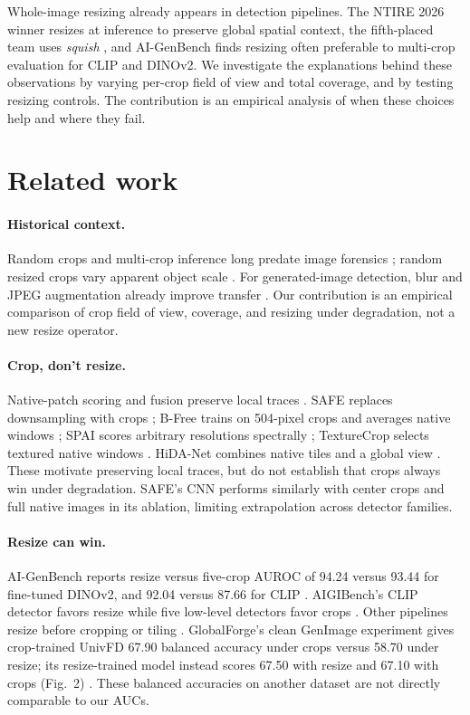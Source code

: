 \documentclass[letterpaper]{article} %
\begin{document}
Whole-image resizing already appears in detection pipelines. The NTIRE
2026 winner resizes at inference to preserve global spatial context, the
fifth-placed team uses \emph{squish} \cite{gushchin2026ntire}, and AI-GenBench
\cite{pellegrini2025aigenbench} finds resizing often preferable to multi-crop
evaluation for CLIP and DINOv2. We investigate the explanations behind these
observations by varying per-crop field of view and total coverage, and by
testing resizing controls. The contribution is an empirical analysis of
when these choices help and where they fail.

\section{Related work}
\label{sec:related}

\paragraph{Historical context.} Random crops and multi-crop inference long predate image forensics \cite{krizhevsky2012imagenet}; random resized crops vary apparent object scale \cite{szegedy2015going}. For generated-image detection, blur and JPEG augmentation already improve transfer \cite{wang2020cnn}. Our contribution is an empirical comparison of crop field of view, coverage, and resizing under degradation, not a new resize operator.

\paragraph{Crop, don't resize.} Native-patch scoring and fusion preserve local traces \cite{corvi2023detection}. SAFE replaces downsampling with crops \cite{li2025safe}; B-Free trains on 504-pixel crops and averages native windows \cite{guillaro2025bfree}; SPAI scores arbitrary resolutions spectrally \cite{karageorgiou2025spai}; TextureCrop selects textured native windows \cite{konstantinidou2025texturecrop}. HiDA-Net combines native tiles and a global view \cite{mu2026hidanet}. These motivate preserving local traces, but do not establish that crops always win under degradation. SAFE's CNN performs similarly with center crops and full native images in its ablation, limiting extrapolation across detector families.

\paragraph{Resize can win.} AI-GenBench reports resize versus five-crop AUROC of 94.24 versus 93.44 for fine-tuned DINOv2, and 92.04 versus 87.66 for CLIP \cite{pellegrini2025aigenbench}. AIGIBench's CLIP detector favors resize while five low-level detectors favor crops \cite{li2025aigibench}. Other pipelines resize before cropping \cite{cozzolino2024raising} or tiling \cite{choi2025warpad}. GlobalForge's clean GenImage experiment gives crop-trained UnivFD 67.90 balanced accuracy under crops versus 58.70 under resize; its resize-trained model instead scores 67.50 with resize and 67.10 with crops (Fig.~2) \cite{cui2026globalforge}. These balanced accuracies on another dataset are not directly comparable to our AUCs.
\end{document}
